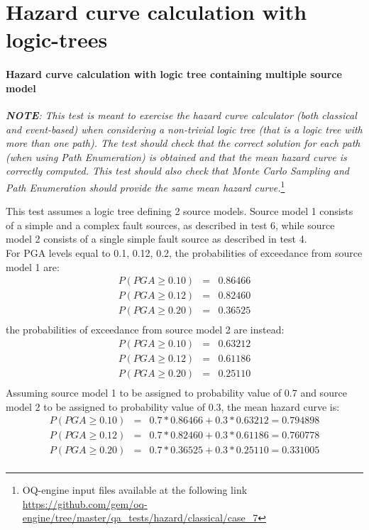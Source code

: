 \section{Hazard curve calculation with logic-trees}
\paragraph{Hazard curve calculation with logic tree containing
multiple source model} \textit{\textbf{NOTE}: This test is meant to exercise the
    hazard curve calculator (both classical and event-based) when considering a
    non-trivial logic tree (that is a logic tree with more than one path). The
    test should check that the correct solution for each path (when using Path
    Enumeration) is obtained and that the mean hazard curve is correctly
    computed. This test should also check that Monte Carlo Sampling and Path
    Enumeration should provide the same mean hazard curve.}\footnote{
    OQ-engine input files available at the following link
    \url{https://github.com/gem/oq-engine/tree/master/qa_tests/hazard/classical/case_7}}

This test assumes a logic tree defining 2 source models. Source model 1 consists
of a simple and a complex fault sources, as described in test 6, while source
model 2 consists of a single simple fault source as described in test 4.\\ For
PGA levels equal to 0.1, 0.12, 0.2, the probabilities of exceedance from source
model 1 are:
\begin{eqnarray}
P(PGA \geq 0.10) &=& 0.86466 \nonumber \\
P(PGA \geq 0.12) &=& 0.82460 \nonumber \\
P(PGA \geq 0.20) &=& 0.36525 \nonumber \\
\end{eqnarray}
the probabilities of exceedance from source model 2 are instead:
\begin{eqnarray}
P(PGA \geq 0.10) &=& 0.63212 \nonumber \\
P(PGA \geq 0.12) &=& 0.61186 \nonumber \\
P(PGA \geq 0.20) &=& 0.25110 \nonumber \\
\end{eqnarray}
Assuming source model 1 to be assigned to probability value of 0.7 and source model 2 to be assigned to probability value of 0.3, the mean hazard curve is:
\begin{eqnarray}
P(PGA \geq 0.10) &=& 0.7 * 0.86466 + 0.3 * 0.63212 = 0.794898\nonumber \\
P(PGA \geq 0.12) &=& 0.7 * 0.82460 + 0.3 * 0.61186 = 0.760778\nonumber \\
P(PGA \geq 0.20) &=& 0.7 * 0.36525 + 0.3 * 0.25110 = 0.331005\nonumber \\
\end{eqnarray}
\clearpage
%
\clearpage
%
